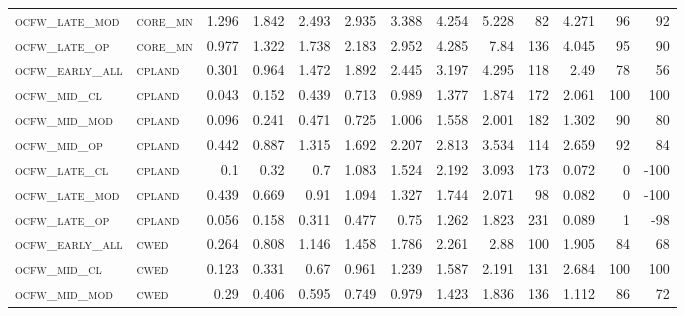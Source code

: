 \begin{landscape}
\begin{center}
\begin{footnotesize}
\begin{longtable}{llrrrrrrrr|rrr}
\textsc{ocfw\_late\_mod } & \textsc{core\_mn  }   & 1.296    & 1.842    & 2.493    & 2.935    & 3.388    & 4.254    & 5.228    & 82     & 4.271         & 96            & 92              \\
\textsc{ocfw\_late\_op  } & \textsc{core\_mn  }   & 0.977    & 1.322    & 1.738    & 2.183    & 2.952    & 4.285    & 7.84     & 136    & 4.045         & 95            & 90              \\
\textsc{ocfw\_early\_all} & \textsc{cpland    }   & 0.301    & 0.964    & 1.472    & 1.892    & 2.445    & 3.197    & 4.295    & 118    & 2.49          & 78            & 56              \\
\textsc{ocfw\_mid\_cl   } & \textsc{cpland    }   & 0.043    & 0.152    & 0.439    & 0.713    & 0.989    & 1.377    & 1.874    & 172    & 2.061         & 100           & 100             \\
\textsc{ocfw\_mid\_mod  } & \textsc{cpland    }   & 0.096    & 0.241    & 0.471    & 0.725    & 1.006    & 1.558    & 2.001    & 182    & 1.302         & 90            & 80              \\
\textsc{ocfw\_mid\_op   } & \textsc{cpland    }   & 0.442    & 0.887    & 1.315    & 1.692    & 2.207    & 2.813    & 3.534    & 114    & 2.659         & 92            & 84              \\
\textsc{ocfw\_late\_cl  } & \textsc{cpland    }   & 0.1      & 0.32     & 0.7      & 1.083    & 1.524    & 2.192    & 3.093    & 173    & 0.072         & 0             & -100            \\
\textsc{ocfw\_late\_mod } & \textsc{cpland    }   & 0.439    & 0.669    & 0.91     & 1.094    & 1.327    & 1.744    & 2.071    & 98     & 0.082         & 0             & -100            \\
\textsc{ocfw\_late\_op  } & \textsc{cpland    }   & 0.056    & 0.158    & 0.311    & 0.477    & 0.75     & 1.262    & 1.823    & 231    & 0.089         & 1             & -98             \\
\textsc{ocfw\_early\_all} & \textsc{cwed      }   & 0.264    & 0.808    & 1.146    & 1.458    & 1.786    & 2.261    & 2.88     & 100    & 1.905         & 84            & 68              \\
\textsc{ocfw\_mid\_cl   } & \textsc{cwed      }   & 0.123    & 0.331    & 0.67     & 0.961    & 1.239    & 1.587    & 2.191    & 131    & 2.684         & 100           & 100             \\
\textsc{ocfw\_mid\_mod  } & \textsc{cwed      }   & 0.29     & 0.406    & 0.595    & 0.749    & 0.979    & 1.423    & 1.836    & 136    & 1.112         & 86            & 72              \\

\end{longtable}
\end{footnotesize}
\end{center}
\end{landscape}
